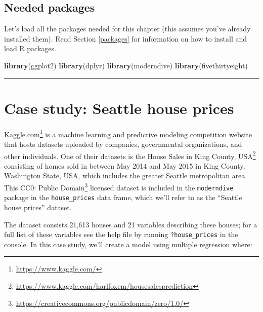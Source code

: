\documentclass[12pt, krantz2,]{krantz}
\makeatletter
\newenvironment{Shaded}{\begin{snugshade}}{\end{snugshade}}
\newcommand{\KeywordTok}[1]{\textcolor[rgb]{0.27,0.27,0.27}{\textbf{#1}}}
\newcommand{\NormalTok}[1]{#1}
\renewcommand{\href}[2]{#2\footnote{\url{#1}}}
\newenvironment{kframe}{%
\medskip{}
\setlength{\fboxsep}{.8em}
 \def\at@end@of@kframe{}%
 \ifinner\ifhmode%
  \def\at@end@of@kframe{\end{minipage}}%
  \begin{minipage}{\columnwidth}%
 \fi\fi%
 \def\FrameCommand##1{\hskip\@totalleftmargin \hskip-\fboxsep
 \colorbox{shadecolor}{##1}\hskip-\fboxsep
     \hskip-\linewidth \hskip-\@totalleftmargin \hskip\columnwidth}%
 \MakeFramed {\advance\hsize-\width
   \@totalleftmargin\z@ \linewidth\hsize
   \@setminipage}}%
 {\par\unskip\endMakeFramed%
 \at@end@of@kframe}
\renewenvironment{Shaded}{\begin{kframe}}{\end{kframe}}
\makeatother
\begin{document}
\hypertarget{needed-packages-9}{%
\subsection*{Needed packages}\label{needed-packages-9}}


Let's load all the packages needed for this chapter (this assumes you've already installed them). Read Section \ref{packages} for information on how to install and load R packages.

\begin{Shaded}
\begin{Highlighting}[]
\KeywordTok{library}\NormalTok{(ggplot2)}
\KeywordTok{library}\NormalTok{(dplyr)}
\KeywordTok{library}\NormalTok{(moderndive)}
\KeywordTok{library}\NormalTok{(fivethirtyeight)}
\end{Highlighting}
\end{Shaded}

\begin{center}\rule{0.5\linewidth}{\linethickness}\end{center}

\hypertarget{seattle-house-prices}{%
\section{Case study: Seattle house prices}\label{seattle-house-prices}}

\href{https://www.kaggle.com/}{Kaggle.com} is a machine learning and predictive modeling competition website that hosts datasets uploaded by companies, governmental organizations, and other individuals. One of their datasets is the \href{https://www.kaggle.com/harlfoxem/housesalesprediction}{House Sales in King County, USA} consisting of homes sold in between May 2014 and May 2015 in King County, Washington State, USA, which includes the greater Seattle metropolitan area. This \href{https://creativecommons.org/publicdomain/zero/1.0/}{CC0: Public Domain} licensed dataset is included in the \texttt{moderndive} package in the \texttt{house\_prices} data frame, which we'll refer to as the ``Seattle house prices'' dataset.

The dataset consists 21,613 houses and 21 variables describing these houses; for a full list of these variables see the help file by running \texttt{?house\_prices} in the console. In this case study, we'll create a model using multiple regression where:
\end{document}
